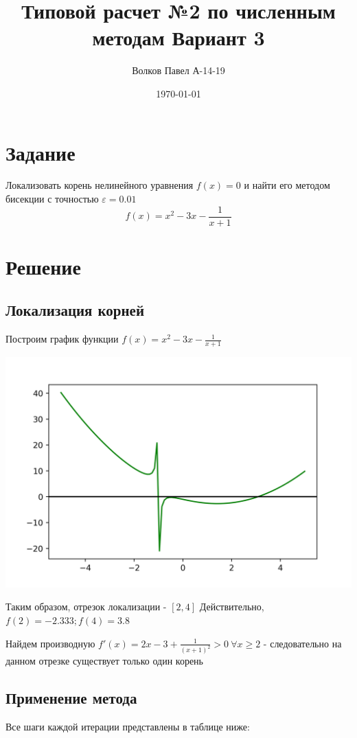 \documentclass[a4paper,12pt]{report} %
\author{Волков Павел А-14-19}
\title{Типовой расчет №2 по численным методам Вариант 3}
\date{\today}
\begin{document}

\maketitle

\newpage
\section*{Задание}
Локализовать корень нелинейного уравнения $f(x) = 0$ и найти его методом бисекции с точностью $\varepsilon = 0.01$
\[
    f(x) = x^2 - 3x - \frac{1}{x + 1}
\]

\section*{Решение}

\subsection*{Локализация корней}
Построим график функции $f(x) = x^2 - 3x - \frac{1}{x + 1}$

\includegraphics{func_plot.png}

Таким образом, отрезок локализации - $[2, 4]$
Действительно, $f(2) = -2.333; f(4) = 3.8$

Найдем производную $f'(x) = 2x - 3 + \frac{1}{(x+1)^2} > 0 ~ \forall x \geq 2$ - следовательно на данном отрезке существует только один корень

\newpage
\subsection*{Применение метода}
Все шаги каждой итерации представлены в таблице ниже:
\end{document}

